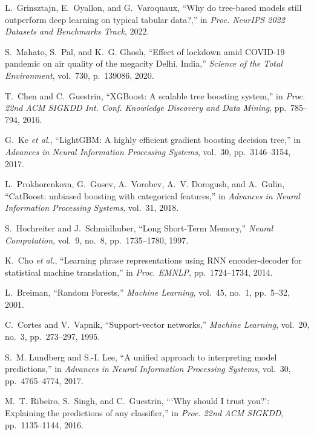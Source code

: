 \documentclass[12pt,a4paper]{report}
\begin{document}
\begin{enumerate}[leftmargin=1.5cm, label={[\arabic*]}]
\item L.~Grinsztajn, E.~Oyallon, and G.~Varoquaux, ``Why do tree-based models still outperform deep learning on typical tabular data?,'' in \textit{Proc. NeurIPS 2022 Datasets and Benchmarks Track}, 2022.

\item S.~Mahato, S.~Pal, and K.~G. Ghosh, ``Effect of lockdown amid COVID-19 pandemic on air quality of the megacity Delhi, India,'' \textit{Science of the Total Environment}, vol.~730, p.~139086, 2020.

\item T.~Chen and C.~Guestrin, ``XGBoost: A scalable tree boosting system,'' in \textit{Proc. 22nd ACM SIGKDD Int. Conf. Knowledge Discovery and Data Mining}, pp.~785--794, 2016.

\item G.~Ke \textit{et al.}, ``LightGBM: A highly efficient gradient boosting decision tree,'' in \textit{Advances in Neural Information Processing Systems}, vol.~30, pp.~3146--3154, 2017.

\item L.~Prokhorenkova, G.~Gusev, A.~Vorobev, A.~V. Dorogush, and A.~Gulin, ``CatBoost: unbiased boosting with categorical features,'' in \textit{Advances in Neural Information Processing Systems}, vol.~31, 2018.

\item S.~Hochreiter and J.~Schmidhuber, ``Long Short-Term Memory,'' \textit{Neural Computation}, vol.~9, no.~8, pp.~1735--1780, 1997.

\item K.~Cho \textit{et al.}, ``Learning phrase representations using RNN encoder-decoder for statistical machine translation,'' in \textit{Proc. EMNLP}, pp.~1724--1734, 2014.

\item L.~Breiman, ``Random Forests,'' \textit{Machine Learning}, vol.~45, no.~1, pp.~5--32, 2001.

\item C.~Cortes and V.~Vapnik, ``Support-vector networks,'' \textit{Machine Learning}, vol.~20, no.~3, pp.~273--297, 1995.

\item S.~M. Lundberg and S.-I. Lee, ``A unified approach to interpreting model predictions,'' in \textit{Advances in Neural Information Processing Systems}, vol.~30, pp.~4765--4774, 2017.

\item M.~T. Ribeiro, S.~Singh, and C.~Guestrin, ```Why should I trust you?': Explaining the predictions of any classifier,'' in \textit{Proc. 22nd ACM SIGKDD}, pp.~1135--1144, 2016.


\end{enumerate}
\end{document}
